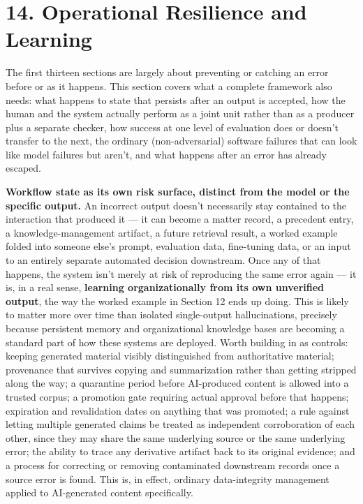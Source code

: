 \section{14. Operational Resilience and Learning}

The first thirteen sections are largely about preventing or catching an error before or as it happens. This section covers what a complete framework also needs: what happens to state that persists after an output is accepted, how the human and the system actually perform as a joint unit rather than as a producer plus a separate checker, how success at one level of evaluation does or doesn't transfer to the next, the ordinary (non-adversarial) software failures that can look like model failures but aren't, and what happens after an error has already escaped.

\textbf{Workflow state as its own risk surface, distinct from the model or the specific output.} An incorrect output doesn't necessarily stay contained to the interaction that produced it --- it can become a matter record, a precedent entry, a knowledge-management artifact, a future retrieval result, a worked example folded into someone else's prompt, evaluation data, fine-tuning data, or an input to an entirely separate automated decision downstream. Once any of that happens, the system isn't merely at risk of reproducing the same error again --- it is, in a real sense, \textbf{learning organizationally from its own unverified output}, the way the worked example in Section 12 ends up doing. This is likely to matter more over time than isolated single-output hallucinations, precisely because persistent memory and organizational knowledge bases are becoming a standard part of how these systems are deployed. Worth building in as controls: keeping generated material visibly distinguished from authoritative material; provenance that survives copying and summarization rather than getting stripped along the way; a quarantine period before AI-produced content is allowed into a trusted corpus; a promotion gate requiring actual approval before that happens; expiration and revalidation dates on anything that was promoted; a rule against letting multiple generated claims be treated as independent corroboration of each other, since they may share the same underlying source or the same underlying error; the ability to trace any derivative artifact back to its original evidence; and a process for correcting or removing contaminated downstream records once a source error is found. This is, in effect, ordinary data-integrity management applied to AI-generated content specifically.

